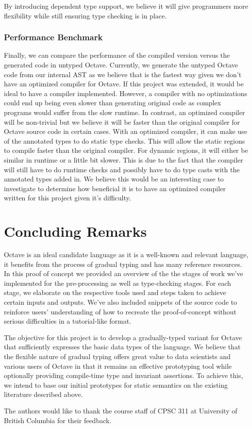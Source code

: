 By introducing dependent type support, we believe it will give programmers more flexibility while still ensuring type checking is in place. 

\subsubsection{Performance Benchmark}
Finally, we can compare the performance of the compiled version versus the generated code in untyped Octave. Currently, we generate the untyped Octave code from our internal AST as we believe that is the fastest way given we don't have an optimized compiler for Octave. If this project was extended, it would be ideal to have a compiler implemented. However, a compiler with no optimizations could end up being even slower than generating original code as complex programs would suffer from the slow runtime. In contrast, an optimized compiler will be non-trivial but we believe it will be faster than the original compiler for Octave source code in certain cases. With an optimized compiler, it can make use of the annotated types to do static type checks. This will allow the static regions to compile faster than the original compiler. For dynamic regions, it will either be similar in runtime or a little bit slower. This is due to the fact that the compiler will still have to do runtime checks and possibly have to do type casts with the annotated types added in. We believe this would be an interesting case to investigate to determine how beneficial it is to have an optimized compiler written for this project given it's difficulty. 

\section{Concluding Remarks}
Octave is an ideal candidate language as it is a well-known and relevant language, it benefits from the process of gradual typing and has many reference resources. In this proof of concept we provided an overview of the the stages of work we've implemented for the pre-processing as well as type-checking stages. For each stage, we elaborate on the respective tools used and steps taken to achieve certain inputs and outputs. We've also included snippets of the source code to reinforce users' understanding of how to recreate the proof-of-concept without serious difficulties in a tutorial-like format.

The objective for this project is to develop a gradually-typed variant for Octave that sufficiently expresses the basic data types of the language. We believe that the flexible nature of gradual typing offers great value to data scientists and various users of Octave in that it remains an effective prototyping tool while optionally providing compile-time type and invariant assertions. To achieve this, we intend to base our initial prototypes for static semantics on the existing literature described above.

\appendix

\begin{acks}
    The authors would like to thank the course staff of CPSC 311 at University
    of British Columbia for their feedback.
\end{acks}